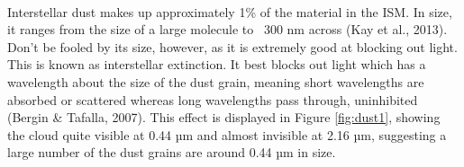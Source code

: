 \documentclass{article}
\begin{document}
\paragraph{}
Interstellar dust makes up approximately 1\% of the material in the ISM. In size, it ranges from the size of a large molecule to ~300 nm across (Kay et al., 2013). Don’t be fooled by its size, however, as it is extremely good at blocking out light. This is known as interstellar extinction. It best blocks out light which has a wavelength about the size of the dust grain, meaning short wavelengths are absorbed or scattered whereas long wavelengths pass through, uninhibited (Bergin \& Tafalla, 2007). This effect is displayed in Figure \ref{fig:dust1}, showing the cloud quite visible at 0.44 µm and almost invisible at 2.16 µm, suggesting a large number of the dust grains are around 0.44 µm in size. 
\end{document}
